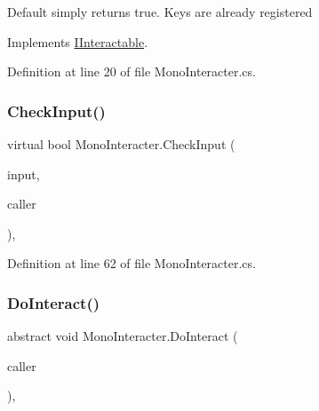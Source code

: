 Default simply returns true. Keys are already registered 



Implements \mbox{\hyperlink{interface_i_interactable_a5142ebbddd5d91a93da436941ad77d8e}{I\+Interactable}}.



Definition at line 20 of file Mono\+Interacter.\+cs.

\mbox{\label{class_mono_interacter_ae24d7fd0cab970a144df6fded900fb01}} 
\subsubsection{\texorpdfstring{Check\+Input()}{CheckInput()}}
{\footnotesize\ttfamily virtual bool Mono\+Interacter.\+Check\+Input (\begin{DoxyParamCaption}\item[{Input\+Control}]{input,  }\item[{\mbox{\hyperlink{class_animal}{Animal}}}]{caller }\end{DoxyParamCaption})\hspace{0.3cm}{\ttfamily [protected]}, {\ttfamily [virtual]}}



Definition at line 62 of file Mono\+Interacter.\+cs.

\mbox{\label{class_mono_interacter_a707ff1aa57e76942005e27243ad1f296}} 
\subsubsection{\texorpdfstring{Do\+Interact()}{DoInteract()}}
{\footnotesize\ttfamily abstract void Mono\+Interacter.\+Do\+Interact (\begin{DoxyParamCaption}\item[{\mbox{\hyperlink{class_animal}{Animal}}}]{caller }\end{DoxyParamCaption})\hspace{0.3cm}{\ttfamily [protected]}, {}}

\mbox{\label{class_mono_interacter_aa94f17988ac01fa0c8feac0406a775f0}} 
